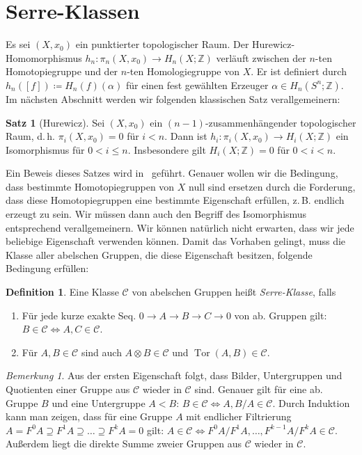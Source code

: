 \documentclass[11pt, a4paper, german]{article}
\theoremstyle{definition}
\newtheorem{satz}[lem]{Satz}
\newtheorem{defn}[lem]{Definition}
\theoremstyle{remark}
\newtheorem*{bem}{Bemerkung}
\newcommand{\Z}{\mathbb{Z}} %
\DeclareMathOperator{\Tor}{Tor} %
\newcommand{\SC}{\mathcal{C}} %
\newcommand{\zB}{z.\,B.}
\renewcommand{\dh}{d.\,h.} %
\begin{document}
\section{Serre-Klassen}

Es sei $(X, x_0)$ ein punktierter topologischer Raum.
Der Hurewicz-Homomorphismus $h_n : \pi_n(X, x_0) \to H_n(X; \Z)$ verläuft zwischen der $n$-ten Homotopiegruppe und der $n$-ten Homologiegruppe von $X$.
Er ist definiert durch $h_n([f]) \coloneqq H_n(f)(\alpha)$ für einen fest gewählten Erzeuger $\alpha \in H_n(S^n; \Z)$.
Im nächsten Abschnitt werden wir folgenden klassischen Satz verallgemeinern:

\begin{satz}[Hurewicz]
  Sei $(X, x_0)$ ein $(n{-}1)$-zusammenhängender topologischer Raum, \dh{} $\pi_i(X, x_0) = 0$ für $i < n$.
  Dann ist $h_i : \pi_i(X, x_0) \to H_i(X; \Z)$ ein Isomorphismus für $0 < i \leq n$.
  Insbesondere gilt $H_i(X; \Z) = 0$ für $0 < i < n$.
\end{satz}

Ein Beweis dieses Satzes wird in~\cite[\mbox{}4.32]{hatcher:at} geführt.
Genauer wollen wir die Bedingung, dass bestimmte Homotopiegruppen von $X$ null sind ersetzen durch die Forderung, dass diese Homotopiegruppen eine bestimmte Eigenschaft erfüllen, \zB{} endlich erzeugt zu sein.
Wir müssen dann auch den Begriff des Isomorphismus entsprechend verallgemeinern.
Wir können natürlich nicht erwarten, dass wir jede beliebige Eigenschaft verwenden können.
Damit das Vorhaben gelingt, muss die Klasse aller abelschen Gruppen, die diese Eigenschaft besitzen, folgende Bedingung erfüllen:

\begin{defn}\label{serre-class}
  Eine Klasse $\SC$ von abelschen Gruppen heißt \emph{Serre-Klasse}, falls
  \begin{enumerate}[label=(\Roman*)]
    \item Für jede kurze exakte Seq. $0 \to A \to B \to C \to 0$ von ab. Gruppen gilt: $B \in \SC \Leftrightarrow A, C \in \SC$.
    \item Für $A, B \in \SC$ sind auch $A \otimes B \in \SC$ und $\Tor(A, B) \in \SC$.
  \end{enumerate}
\end{defn}

\begin{bem}
  Aus der ersten Eigenschaft folgt, dass Bilder, Untergruppen und Quotienten einer Gruppe aus $\SC$ wieder in $\SC$ sind.
  Genauer gilt für eine ab. Gruppe $B$ und eine Untergruppe $A < B$: $B \in \SC \iff A, B/A \in \SC$.
  Durch Induktion kann man zeigen, dass für eine Gruppe $A$ mit endlicher Filtrierung
  $A = F^0 A \supseteq F^1 A \supseteq \ldots \supseteq F^k A = 0$
  gilt: $A \in \SC \iff F^0 A / F^1 A, \ldots, F^{k-1} A / F^k A \in \SC$.
  Außerdem liegt die direkte Summe zweier Gruppen aus $\SC$ wieder in $\SC$.
\end{bem}
\end{document}
